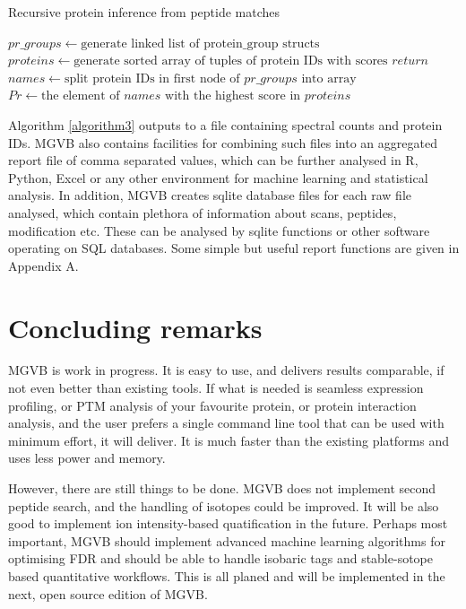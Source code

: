 \documentclass[default]{sn-jnl}
\theoremstyle{thmstyleone}%
\theoremstyle{thmstyletwo}%
\theoremstyle{thmstylethree}%
\begin{document}
\begin{algorithm}
\caption{Recursive protein inference from peptide matches}\label{algorithm3}
\begin{algorithmic}[1]
\State $pr\_groups \gets \text {generate linked list of protein\_group structs}$ 
\State $proteins \gets \text {generate sorted array of tuples of protein IDs with scores}$ 
        \State $return$
    \EndIf
    \State $names \gets \text {split protein IDs in first node of $pr\_groups$ into array} $
    \State $Pr \gets \text {the element of $names$ with the highest score in $proteins$}$
    \State {}
    \State {}
    \State {}     
 \EndFunction
 \State {}
\end{algorithmic}
\end{algorithm}
\bigskip

Algorithm \ref{algorithm3} outputs to a file containing spectral counts and protein IDs. MGVB also contains facilities for combining such files into an aggregated report file of comma separated values, which can be further analysed in R, Python, Excel or any other environment for machine learning and statistical analysis. In addition, MGVB creates sqlite database files for each raw file analysed, which contain plethora of information about scans, peptides, modification etc. These can be analysed by sqlite functions or other software operating on SQL databases. Some simple but useful report functions are given in Appendix A.

\section {Concluding remarks} \label {sec4}
MGVB is work in progress. It is easy to use, and delivers results comparable, if not even better than existing tools. If what is needed is seamless expression profiling, or PTM analysis of your favourite protein,  or protein interaction analysis, and the user prefers a single command line tool that can be used with minimum effort, it will deliver. It is much faster than the existing platforms and uses less power and memory. 

However, there are still things to be done. MGVB does not implement second peptide search, and the handling of isotopes could be improved. It will be also good to implement ion intensity-based quatification in the future. Perhaps most important, MGVB should implement advanced machine learning algorithms for optimising FDR and should be able to handle isobaric tags and stable-sotope based quantitative workflows. This is all planed and will be implemented in the next, open source edition of MGVB.
\end{document}

